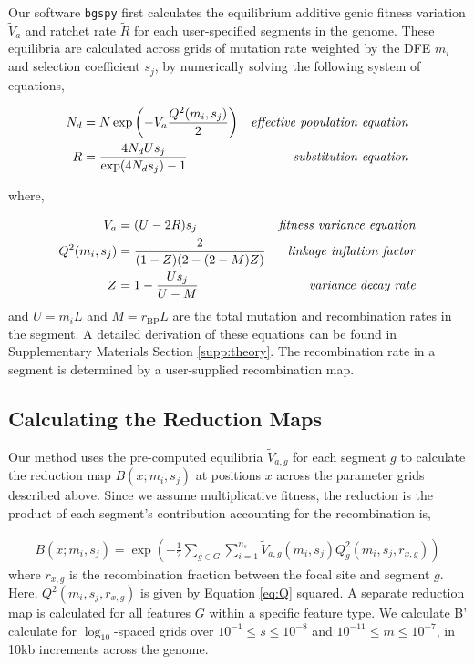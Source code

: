 \documentclass[11pt]{article}
\begin{document}
Our software \texttt{bgspy} first calculates the equilibrium additive genic
fitness variation $\widetilde{V}_a$ and ratchet rate $\widetilde{R}$ for each
user-specified segments in the genome. These equilibria are calculated across
grids of mutation rate weighted by the DFE $m_i$ and selection coefficient
$s_j$, by numerically solving the following system of equations,

\begin{align}
  \label{eq:}
  {N}_{d} &= N \exp \left( -V_a \frac{Q^2(m_i, s_j)}{2} \right) & \text{\emph{effective population equation}} \\
  R &= \frac{4N_dU s_j}{\exp(4 N_d s_j)-1}  & \text{\emph{substitution equation}} 
\end{align}

where,

\begin{align}
  V_a &= (U - 2 R) s_j & \text{\emph{fitness variance equation}} \\
  Q^2(m_i, s_j) &= \frac{2}{(1-Z)(2-(2-M)Z)} & \text{\emph{linkage inflation factor}} \\
  Z &= 1 - \frac{Us_j}{U-{M}} & \text{\emph{variance decay rate}}
\end{align}
%
and $U = m_i L$ and $M = r_\text{BP} L$ are the total mutation and
recombination rates in the segment. A detailed derivation of these equations
can be found in Supplementary Materials Section \ref{supp:theory}. The recombination
rate in a segment is determined by a user-supplied recombination map.

\subsection*{Calculating the Reduction Maps}
\label{sec:methods-maps}

Our method uses the pre-computed equilibria $\widetilde{V}_{a,g}$ for each
segment $g$ to calculate the reduction map $B(x; m_i, s_j)$ at positions $x$
across the parameter grids described above. Since we assume multiplicative
fitness, the reduction is the product of each segment's contribution accounting
for the recombination is,

\begin{align}
    B(x; m_i, s_j) = \exp\left(- \frac{1}{2}\sum_{g \in G} \sum_{i=1}^{n_s} \widetilde{V}_{a,g}(m_i, s_j) Q_g^2(m_i, s_j, r_{x, g})\right)
\end{align}
%
where $r_{x, g}$ is the recombination fraction between the focal site and
segment $g$. Here, $Q^2(m_i, s_j, r_{x,g})$ is given by Equation \eqref{eq:Q}
squared. A separate reduction map is calculated for all features $G$ within a
specific feature type. We calculate B' calculate for $\log_{10}$-spaced grids
over $10^{-1} \le s \le 10^{-8}$ and $10^{-11} \le m \le 10^{-7}$, in 10kb
increments across the genome.
\end{document}
